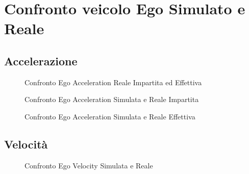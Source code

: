 \section{Confronto veicolo Ego Simulato e Reale}
\subsection{Accelerazione}
\begin{figure}[H]
    \centering
    \caption{Confronto Ego Acceleration Reale Impartita ed Effettiva}
    \label{fig:acceleration_effettiva_impartita}
\end{figure}
\begin{figure}[H]
    \centering
    \caption{Confronto Ego Acceleration Simulata e Reale Impartita}
    \label{fig:acceleration_impartita}
\end{figure}
\begin{figure}[H]
    \centering
    \caption{Confronto Ego Acceleration Simulata e Reale Effettiva}
    \label{fig:acceleration_effettiva}
\end{figure}
\subsection{Velocità}
\begin{figure}[H]
    \centering
    \caption{Confronto Ego Velocity Simulata e Reale}
    \label{fig:ego_velocity_reale}
\end{figure}
